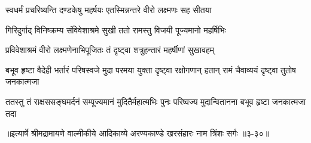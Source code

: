 \twolineshloka
{स्वधर्मं प्रचरिष्यन्ति दण्डकेषु महर्षयः}
{एतस्मिन्नन्तरे वीरो लक्ष्मणः सह सीतया} %

\onelineshloka
{गिरिदुर्गाद् विनिष्क्रम्य संविवेशाश्रमे सुखी ततो रामस्तु विजयी पूज्यमानो महर्षिभिः} %

\twolineshloka
{प्रविवेशाश्रमं वीरो लक्ष्मणेनाभिपूजितः}
{तं दृष्ट्वा शत्रुहन्तारं महर्षीणां सुखावहम्} %

\threelineshloka
{बभूव हृष्टा वैदेही भर्तारं परिषस्वजे}
{मुदा परमया युक्ता दृष्ट्वा रक्षोगणान् हतान्}
{रामं चैवाव्ययं दृष्ट्वा तुतोष जनकात्मजा} %

\twolineshloka
{ततस्तु तं राक्षससङ्घमर्दनं सम्पूज्यमानं मुदितैर्महात्मभिः}
{पुनः परिष्वज्य मुदान्वितानना बभूव हृष्टा जनकात्मजा तदा} %


॥इत्यार्षे श्रीमद्रामायणे वाल्मीकीये आदिकाव्ये अरण्यकाण्डे खरसंहारः नाम त्रिंशः सर्गः ॥३-३०॥
